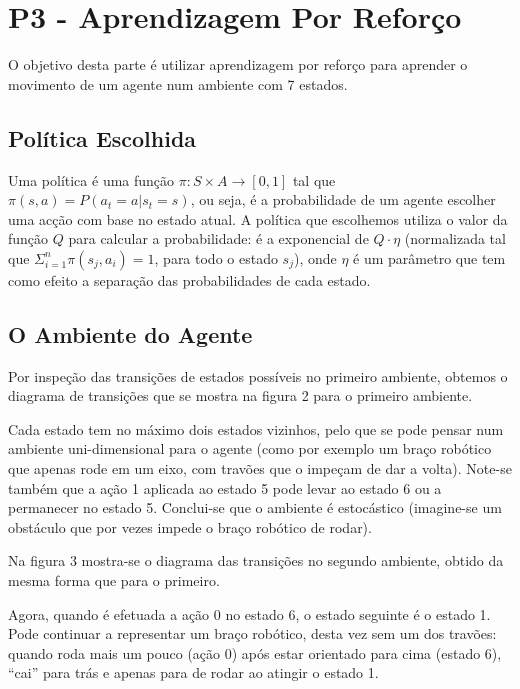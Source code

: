 \documentclass[twocolumn, 9pt]{extarticle}
\begin{document}
\section{P3 - Aprendizagem Por Reforço}
O objetivo desta parte é utilizar aprendizagem por reforço para aprender o movimento de um agente num ambiente com 7 estados.\par


\subsection{Política Escolhida}
Uma política é uma função $\pi: S \times A \to [0, 1]$ tal que $\pi(s,a) = P(a_t = a | s_t = s)$, ou seja, é a probabilidade de um agente escolher uma acção com base no estado atual.
A política que escolhemos utiliza o valor da função $Q$ para calcular a probabilidade: é a exponencial de $Q \cdot \eta $ (normalizada tal que $\Sigma_{i=1}^n \pi(s_j,a_i) = 1$, para todo o estado $s_j$), onde $\eta$ é um parâmetro que tem como efeito a separação das probabilidades de cada estado.\par

\subsection{O Ambiente do Agente}
Por inspeção das transições de estados possíveis no primeiro ambiente, obtemos o diagrama de transições que se mostra na figura 2 para o primeiro ambiente. \par

Cada estado tem no máximo dois estados vizinhos, pelo que se pode pensar num ambiente uni-dimensional para o agente (como por exemplo um braço robótico que apenas rode em um eixo, com travões que o impeçam de dar a volta). Note-se também que a ação 1 aplicada ao estado 5 pode levar ao estado 6 ou a permanecer no estado 5. Conclui-se que o ambiente é estocástico (imagine-se um obstáculo que por vezes impede o braço robótico de rodar).\par

Na figura 3 mostra-se o diagrama das transições no segundo ambiente, obtido da mesma forma que para o primeiro.\par
Agora, quando é efetuada a ação 0 no estado 6, o estado seguinte é o estado 1. Pode continuar a representar um braço robótico, desta vez sem um dos travões: quando roda mais um pouco (ação 0) após estar orientado para cima (estado 6), ``cai'' para trás e apenas para de rodar ao atingir o estado 1.\par
\end{document}
